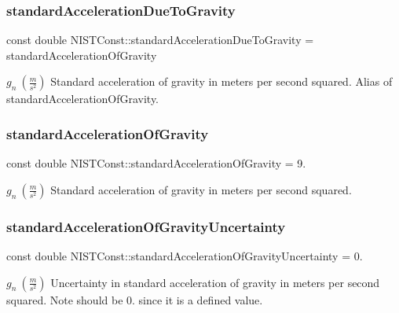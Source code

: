 \subsubsection{\texorpdfstring{standard\+Acceleration\+Due\+To\+Gravity}{standardAccelerationDueToGravity}}
{\footnotesize\ttfamily const double N\+I\+S\+T\+Const\+::standard\+Acceleration\+Due\+To\+Gravity = standard\+Acceleration\+Of\+Gravity}

$g_n \ (\frac{m}{s^2})$ Standard acceleration of gravity in meters per second squared. Alias of standard\+Acceleration\+Of\+Gravity. \mbox{\label{group___gravity_acceleration_gad5bc5f7f030bc2c467a8430e00b42f5e}} 
\subsubsection{\texorpdfstring{standard\+Acceleration\+Of\+Gravity}{standardAccelerationOfGravity}}
{\footnotesize\ttfamily const double N\+I\+S\+T\+Const\+::standard\+Acceleration\+Of\+Gravity = 9.}

$g_n \ (\frac{m}{s^2})$ Standard acceleration of gravity in meters per second squared. \mbox{\label{group___gravity_acceleration_gaabc6df92c25677a5b767445f101d4f57}} 
\subsubsection{\texorpdfstring{standard\+Acceleration\+Of\+Gravity\+Uncertainty}{standardAccelerationOfGravityUncertainty}}
{\footnotesize\ttfamily const double N\+I\+S\+T\+Const\+::standard\+Acceleration\+Of\+Gravity\+Uncertainty = 0.}

$g_n \ (\frac{m}{s^2})$ Uncertainty in standard acceleration of gravity in meters per second squared. Note should be 0. since it is a defined value. 